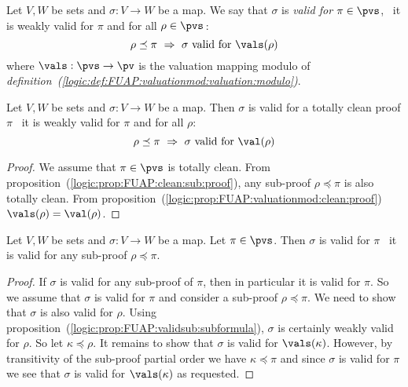 \begin{defin}\label{logic:def:FUAP:strongvalidsub:strongvalidsub}
Let $V, W$ be sets and $\sigma:V\to W$ be a map. We say that
$\sigma$ is {\em valid for} $\pi\in\pvs$, \ifand\ it is weakly valid
for $\pi$ and for all $\rho\in\pvs$\,:
    \[
    \rho\preceq\pi\ \Rightarrow\ \mbox{$\sigma$ valid for
    $\vals(\rho)$}
    \]
where $\vals:\pvs\to\pv$ is the valuation mapping modulo of {\em
definition~(\ref{logic:def:FUAP:valuationmod:valuation:modulo})}.
\end{defin}
\begin{prop}\label{logic:prop:FUAP:strongvalidsub:valuation:v:mod}
Let $V, W$ be sets and $\sigma:V\to W$ be a map. Then $\sigma$ is
valid for a totally clean proof $\pi$ \ifand\ it is weakly valid for
$\pi$ and for all $\rho$:
    \[
    \rho\preceq\pi\ \Rightarrow\ \mbox{$\sigma$ valid for
    $\val(\rho)$}
    \]
\end{prop}
\begin{proof}
We assume that $\pi\in\pvs$ is totally clean. From
proposition~(\ref{logic:prop:FUAP:clean:sub:proof}), any sub-proof
$\rho\preceq\pi$ is also totally clean. From
proposition~(\ref{logic:prop:FUAP:valuationmod:clean:proof})
$\vals(\rho)=\val(\rho)$.
\end{proof}

\begin{prop}\label{logic:prop:FUAP:strongvalidsub:subformula}
Let $V, W$ be sets and $\sigma:V\to W$ be a map. Let $\pi\in\pvs$.
Then $\sigma$ is valid for $\pi$ \ifand\ it is valid for any
sub-proof $\rho\preceq\pi$.
\end{prop}
\begin{proof}
If $\sigma$ is valid for any sub-proof of $\pi$, then in particular
it is valid for $\pi$. So we assume that $\sigma$ is valid for $\pi$
and consider a sub-proof $\rho\preceq\pi$. We need to show that
$\sigma$ is also valid for $\rho$. Using
proposition~(\ref{logic:prop:FUAP:validsub:subformula}), $\sigma$ is
certainly weakly valid for $\rho$. So let $\kappa\preceq\rho$. It
remains to show that $\sigma$ is valid for $\vals(\kappa)$. However,
by transitivity of the sub-proof partial order we have
$\kappa\preceq\pi$ and since $\sigma$ is valid for $\pi$ we see that
$\sigma$ is valid for $\vals(\kappa)$ as requested.
\end{proof}

